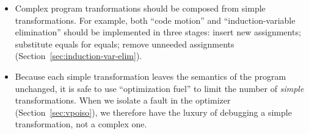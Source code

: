 \documentclass[blockstyle,preprint,nocopyrightspace]{sigplanconf}
\newcommand\secref[1]{Section~\ref{sec:#1}}
\begin{document}
\begin{itemize}
\item
Complex program tranformations should be composed from simple
transformations. 
For example, both ``code motion'' and ``induction-variable
elimination'' should be implemented in three stages: insert new assignments;
substitute equals for equals; remove unneeded assignments
(\secref{induction-var-elim}). 

\item 
Because each simple transformation leaves the semantics
of the program unchanged, 
it is safe to use 
``optimization fuel'' to limit the number of \emph{simple}
transformations.
 When we isolate a fault in the optimizer
(\secref{vpoiso}), we therefore have the luxury of debugging a simple
 transformation, not a complex one.
\end{itemize}
\end{document}
